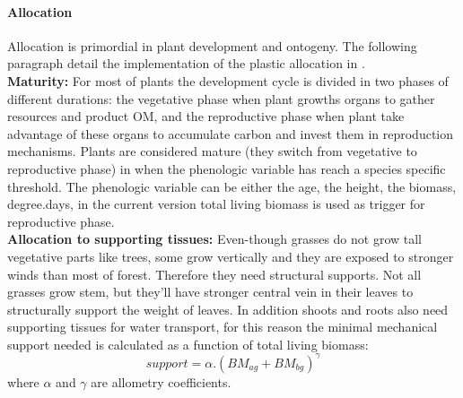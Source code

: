 \paragraph{Allocation} \label{par:allocation}
Allocation is primordial in plant development and ontogeny. The following paragraph detail the implementation of the plastic allocation in \model.\\

\textbf{Maturity:} For most of plants the development cycle is divided in two phases of different durations: the vegetative phase when plant growths organs to gather resources and product OM, and the reproductive phase when plant take advantage of these organs to accumulate carbon and invest them in reproduction mechanisms. Plants are considered mature (they switch from vegetative to reproductive phase) in \model when the phenologic variable has reach a species specific threshold. The phenologic variable can be either the age, the height, the biomass, degree.days, in the current version total living biomass is used as trigger for reproductive phase.\\

\textbf{Allocation to supporting tissues:} Even-though grasses do not grow tall vegetative parts like trees, some grow vertically and they are exposed to stronger winds than most of forest. Therefore they need structural supports. Not all grasses grow stem, but they'll have stronger central vein in their leaves to structurally support the weight of leaves. In addition shoots and roots also need supporting tissues for water transport, for this reason the minimal mechanical support needed is calculated as a function of total living biomass:
\begin{equation}
support = \alpha . (BM_{ag} + BM_{bg})^\gamma
\end{equation}
where $\alpha$ and $\gamma$ are allometry coefficients.\\

